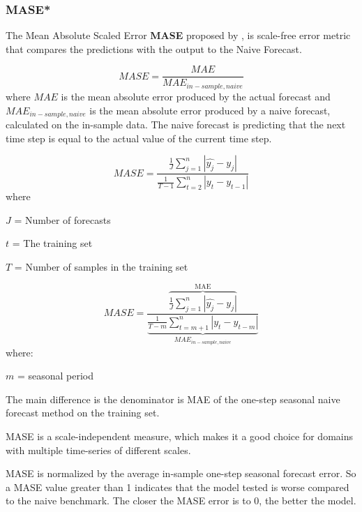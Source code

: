 \subsubsection{MASE*}
The Mean Absolute Scaled Error \textbf{MASE}
proposed by \cite{Hyndman2006}, is scale-free
error metric that compares the predictions with
the output to the Naive Forecast.


\begin{displaymath}
  MASE = \frac{MAE}{MAE_{in-sample, naive}}
\end{displaymath}
where $MAE$ is the mean absolute error
produced by the actual forecast and
$MAE_{in-sample, naive} $
is the mean absolute error produced by
a naive forecast, calculated on the in-sample data.
The naive forecast is predicting that the next
time step is equal to the actual value of the current time step.


\begin{displaymath}
  \label{eq:MASE}
  MASE = \frac{\frac{1}{J} \sum_{j=1}^n |\hat{y_j} - y_j|}{\frac{1}{T-1} \sum_{t=2}^n |y_t - y_{t-1}|}
\end{displaymath}
where

$J$ = Number of forecasts

$t$ = The training set

$T$ = Number of samples in the training set

\begin{equation}
  \label{eq:MASE-Seasonal}
  MASE = \frac{
    \overbrace{
      \frac{1}{J} \sum_{j=1}^n |\hat{y_j} - y_j|}^\text{MAE}}{
    \underbrace{
      \frac{1}{T-m} \sum_{t=m+1}^n |y_t - y_{t-m}|}_\text{$MAE_{in-sample, naive}$}
  }
\end{equation}
where:

$m$ = seasonal period

The main difference is the denominator is MAE
of the one-step seasonal naive forecast method on the training set.

MASE is a scale-independent measure, which makes it
a good choice for domains with multiple time-series of
different scales.

MASE is normalized by the average in-sample one-step
seasonal forecast error. So a MASE value greater than
1 indicates that the model tested is worse compared
to the naive benchmark.
The closer the MASE error is to 0, the better the model.


